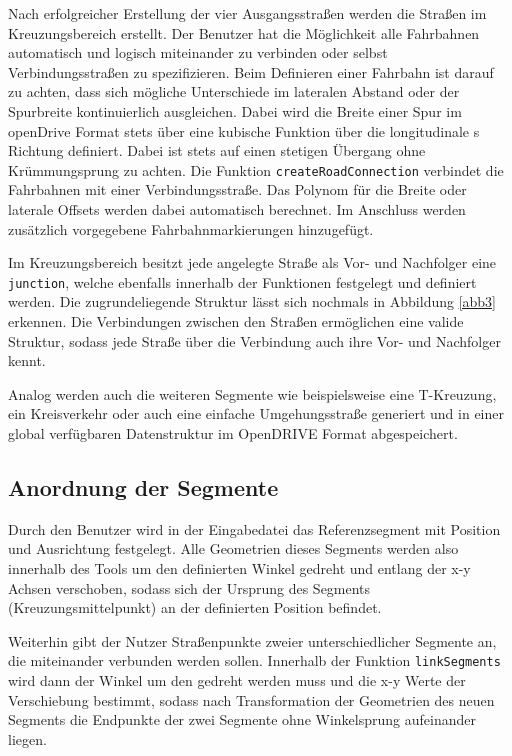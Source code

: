 Nach erfolgreicher Erstellung der vier Ausgangsstraßen werden die Straßen im Kreuzungsbereich erstellt. Der Benutzer hat die Möglichkeit alle Fahrbahnen automatisch und logisch miteinander zu verbinden oder selbst Verbindungsstraßen zu spezifizieren. Beim Definieren einer Fahrbahn ist darauf zu achten, dass sich mögliche Unterschiede im lateralen Abstand oder der Spurbreite kontinuierlich ausgleichen. Dabei wird die Breite einer Spur im openDrive Format stets über eine kubische Funktion über die longitudinale s Richtung definiert. Dabei ist stets auf einen stetigen Übergang ohne Krümmungsprung zu achten. Die Funktion \texttt{createRoadConnection} verbindet die Fahrbahnen mit einer Verbindungsstraße. Das Polynom für die Breite oder laterale Offsets werden dabei automatisch berechnet. Im Anschluss werden zusätzlich vorgegebene Fahrbahnmarkierungen hinzugefügt.

Im Kreuzungsbereich besitzt jede angelegte Straße als Vor- und Nachfolger eine \texttt{junction}, welche ebenfalls innerhalb der Funktionen festgelegt und definiert werden. Die zugrundeliegende Struktur lässt sich nochmals in Abbildung \ref{abb3} erkennen. Die Verbindungen zwischen den Straßen ermöglichen eine valide Struktur, sodass jede Straße über die Verbindung auch ihre Vor- und Nachfolger kennt.

Analog werden auch die weiteren Segmente wie beispielsweise eine T-Kreuzung, ein Kreisverkehr oder auch eine einfache Umgehungsstraße generiert und in einer global verfügbaren Datenstruktur im OpenDRIVE Format abgespeichert.

\subsection{Anordnung der Segmente}

Durch den Benutzer wird in der Eingabedatei das Referenzsegment mit Position und Ausrichtung festgelegt. Alle Geometrien dieses Segments werden also innerhalb des Tools um den definierten Winkel gedreht und entlang der x-y Achsen verschoben, sodass sich der Ursprung des Segments (Kreuzungsmittelpunkt) an der definierten Position befindet.

Weiterhin gibt der Nutzer Straßenpunkte zweier unterschiedlicher Segmente an, die miteinander verbunden werden sollen. Innerhalb der Funktion \texttt{linkSegments} wird dann der Winkel um den gedreht werden muss und die x-y Werte der Verschiebung bestimmt, sodass nach Transformation der Geometrien des neuen Segments die Endpunkte der zwei Segmente ohne Winkelsprung aufeinander liegen.


